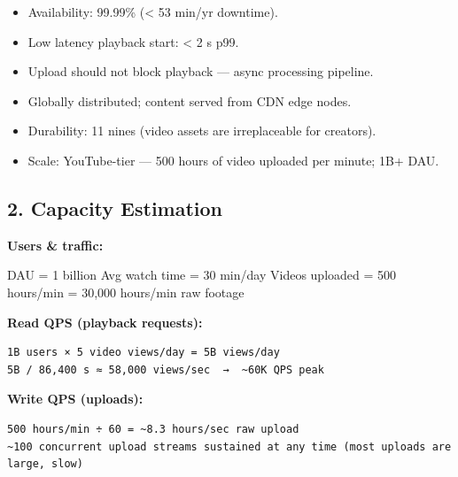 \documentclass[11pt]{article}
\providecommand{\tightlist}{\setlength{\itemsep}{1pt}\setlength{\parskip}{0pt}}
\newenvironment{Shaded}{\begin{snugshade}}{\end{snugshade}}
\newcommand{\BuiltInTok}[1]{\textcolor[rgb]{0.50,0.55,0.55}{#1}}
\newcommand{\DecValTok}[1]{\textcolor[rgb]{0.96,0.45,0.00}{#1}}
\newcommand{\NormalTok}[1]{\textcolor[rgb]{0.81,0.81,0.76}{#1}}
\newcommand{\OperatorTok}[1]{\textcolor[rgb]{0.81,0.81,0.76}{#1}}
\begin{document}
\begin{itemize}
\tightlist
\item
  Availability: 99.99\% (\textless{} 53 min/yr downtime).
\item
  Low latency playback start: \textless{} 2 s p99.
\item
  Upload should not block playback --- async processing pipeline.
\item
  Globally distributed; content served from CDN edge nodes.
\item
  Durability: 11 nines (video assets are irreplaceable for creators).
\item
  Scale: YouTube-tier --- 500 hours of video uploaded per minute; 1B+ DAU.
\end{itemize}

\subsection{2. Capacity Estimation}\label{2-capacity-estimation}

\textbf{Users \& traffic:}


\begin{Shaded}
\begin{Highlighting}[]
\NormalTok{DAU             }\OperatorTok{=} \DecValTok{1}\NormalTok{ billion}
\NormalTok{Avg watch time  }\OperatorTok{=} \DecValTok{30} \BuiltInTok{min}\OperatorTok{/}\NormalTok{day}
\NormalTok{Videos uploaded }\OperatorTok{=} \DecValTok{500}\NormalTok{ hours}\OperatorTok{/}\BuiltInTok{min} \OperatorTok{=} \DecValTok{30}\NormalTok{,}\DecValTok{000}\NormalTok{ hours}\OperatorTok{/}\BuiltInTok{min}\NormalTok{ raw footage}
\end{Highlighting}
\end{Shaded}

\textbf{Read QPS (playback requests):}

\setcodelang{}

\begin{verbatim}
1B users × 5 video views/day = 5B views/day
5B / 86,400 s ≈ 58,000 views/sec  →  ~60K QPS peak
\end{verbatim}

\textbf{Write QPS (uploads):}

\setcodelang{}

\begin{verbatim}
500 hours/min ÷ 60 = ~8.3 hours/sec raw upload
~100 concurrent upload streams sustained at any time (most uploads are large, slow)
\end{verbatim}
\end{document}
